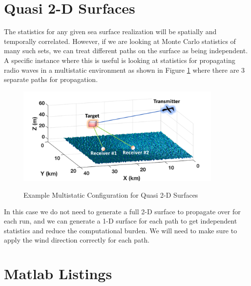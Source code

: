 \section {Quasi 2-D Surfaces}
The statistics for any given sea surface realization will be spatially and temporally correlated. However, if we are looking at Monte Carlo statistics of many such sets, we can treat different paths on the surface as being independent. A specific instance where this is useful is looking at statistics for propagating radio waves in a multistatic environment as shown in Figure \ref{os_fig:16} where there are 3 separate paths for propagation.

\begin{figure}[H]
  \begin{center}
\includegraphics[width=4in]{../media/multistatic/ms_rf_concept2.png}
  \end{center}
  \renewcommand{\baselinestretch}{1} \small\normalsize
  \begin{quote}
    \caption[Example Multistatic Configuration for Quasi 2-D Surfaces]{Example Multistatic Configuration for Quasi 2-D Surfaces\label{os_fig:16}}
  \end{quote}
\end{figure}
\renewcommand{\baselinestretch}{2} \small\normalsize

In this case we do not need to generate a full 2-D surface to propagate over for each run, and we can generate a 1-D surface for each path to get independent statistics and reduce the computational burden. We will need to make sure to apply the wind direction correctly for each path.

\section {Matlab Listings}






